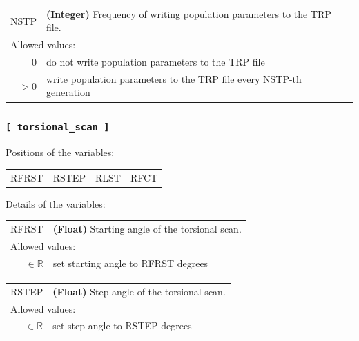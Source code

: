 \documentclass[10pt,a4paper,openany]{memoir}
\numberwithin{equation}{section}
\begin{document}
{
\begin{tabular}{r@{ : }l}
\label{descr:nstp}
      NSTP&\textbf{(Integer)} Frequency of writing population parameters to the TRP file.                                              \\ 
\multicolumn{2}{l}{Allowed values:} \\ 
     \(0\)&do not write population parameters to the TRP file                                                   \\ 
    \(>0\)&write population parameters to the TRP file every NSTP-th generation                                 \\ 
\end{tabular}
\vspace{1ex}
}


\subsubsection{\texttt{[~torsional\_scan~]}}
\label{sec:inp-torsional_scan}

Positions of the variables:
\begin{center}
  \begin{tabular}{llll}
    RFRST & RSTEP & RLST & RFCT \\
  \end{tabular}
\end{center}

\noindent Details of the variables:
\vspace{2ex}

{
\begin{tabular}{r@{ : }l}
\label{descr:rfrst}
     RFRST&\textbf{(Float)} Starting angle of the torsional scan.                                                                \\ 
\multicolumn{2}{l}{Allowed values:} \\ 
\(\in\mathbb{R}\)&set starting angle to RFRST degrees                                                                  \\ 
\end{tabular}
\vspace{1ex}
}

{
\begin{tabular}{r@{ : }l}
\label{descr:rstep}
     RSTEP&\textbf{(Float)} Step angle of the torsional scan.                                                                    \\ 
\multicolumn{2}{l}{Allowed values:} \\ 
\(\in\mathbb{R}\)&set step angle to RSTEP degrees                                                                      \\ 
\end{tabular}
\vspace{1ex}
}
\end{document}
